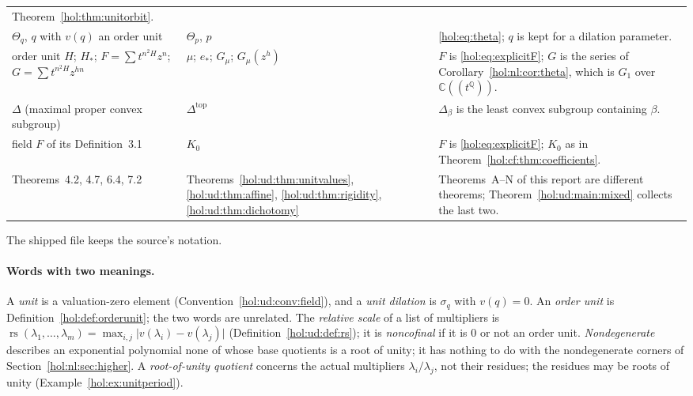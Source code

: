 \documentclass[11pt]{article}
\numberwithin{equation}{section}
\theoremstyle{definition}
\theoremstyle{remark}
\newcommand{\C}{\mathbb C}
\newcommand{\Q}{\mathbb Q}
\newcommand{\abs}[1]{\lvert#1\rvert}
\begin{document}
{\begin{longtable}{@{}>{\raggedright\arraybackslash}p{}
>{\raggedright\arraybackslash}p{}
>{\raggedright\arraybackslash}p{}@{}}
Theorem~\ref{hol:thm:unitorbit}.\\
$\Theta_q$, $q$ with $v(q)$ an order unit & $\Theta_p$, $p$ &
\eqref{hol:eq:theta}; $q$ is kept for a dilation parameter.\\
order unit $H$; $H_*$; $F=\sum t^{n^2H}z^n$; $G=\sum t^{n^2H}z^{hn}$ & $\mu$;
$e_*$; $G_\mu$; $G_\mu(z^h)$ & $F$ is \eqref{hol:eq:explicitF}; $G$ is the
series of Corollary~\ref{hol:nl:cor:theta}, which is $G_1$ over $\C((t^\Q))$.\\
$\Delta$ (maximal proper convex subgroup) & $\Delta^{\mathrm{top}}$ &
$\Delta_\beta$ is the least convex subgroup containing $\beta$.\\
field $F$ of its Definition~3.1 & $K_0$ & $F$ is \eqref{hol:eq:explicitF};
$K_0$ as in Theorem~\ref{hol:cf:thm:coefficients}.\\
Theorems~4.2, 4.7, 6.4, 7.2 & Theorems~\ref{hol:ud:thm:unitvalues},
\ref{hol:ud:thm:affine}, \ref{hol:ud:thm:rigidity},
\ref{hol:ud:thm:dichotomy} & Theorems~A--N of this report are different
theorems; Theorem~\ref{hol:ud:main:mixed} collects the last two.\\
\bottomrule
\end{longtable}}
The shipped file  keeps the
source's notation.

\paragraph{Words with two meanings.}
A \emph{unit} is a valuation-zero element (Convention~\ref{hol:ud:conv:field}),
and a \emph{unit dilation} is $\sigma_q$ with $v(q)=0$. An \emph{order unit}
is Definition~\ref{hol:def:orderunit}; the two words are unrelated. The
\emph{relative scale} of a list of multipliers is
$\operatorname{rs}(\lambda_1,\ldots,\lambda_m)=\max_{i,j}\abs{v(\lambda_i)-
v(\lambda_j)}$ (Definition~\ref{hol:ud:def:rs}); it is \emph{noncofinal} if it
is $0$ or not an order unit. \emph{Nondegenerate} describes an exponential
polynomial none of whose base quotients is a root of unity; it has nothing
to do with the nondegenerate corners of Section~\ref{hol:nl:sec:higher}. A
\emph{root-of-unity quotient} concerns the actual multipliers $\lambda_i/\lambda_j$,
not their residues; the residues may be roots of unity
(Example~\ref{hol:ex:unitperiod}).
\end{document}
